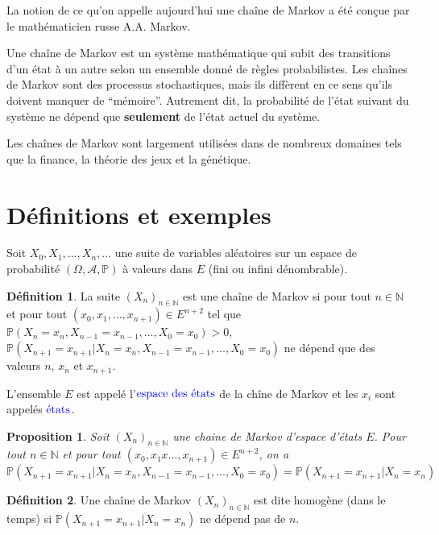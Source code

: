 \documentclass[
]{book}
\newtheorem{proposition}{Proposition}[chapter]
\theoremstyle{definition}
\newtheorem{definition}{Définition}[chapter]
\theoremstyle{definition}
\theoremstyle{definition}
\theoremstyle{remark}
\begin{document}
La notion de ce qu'on appelle aujourd'hui une chaîne de Markov a été conçue par le mathématicien russe A.A. Markov.

Une chaîne de Markov est un système mathématique qui subit des transitions d'un état à un autre selon un ensemble donné de règles probabilistes. Les chaînes de Markov sont des processus stochastiques, mais ils diffèrent en ce sens qu'ils doivent manquer de ``mémoire''. Autrement dit, la probabilité de l'état suivant du système ne dépend que \textbf{seulement} de l'état actuel du système.

Les chaînes de Markov sont largement utilisées dans de nombreux domaines tels que la finance, la théorie des jeux et la génétique.

\hypertarget{duxe9finitions-et-exemples}{%
\section{Définitions et exemples}\label{duxe9finitions-et-exemples}}

Soit \(X_0, X_1,\ldots, X_n, \ldots\) une suite de variables aléatoires sur un espace de probabilité \((\Omega,\mathcal{A}, \mathbb{P})\) à valeurs dans \(E\) (fini ou infini dénombrable).

\begin{definition}
\protect\hypertarget{def:unnamed-chunk-21}{}{\label{def:unnamed-chunk-21} }La suite \((X_n)_{n \in \mathbb{N}}\) est une chaîne de Markov si pour tout \(n \in \mathbb{N}\) et pour tout \((x_0,x_1, \ldots,x_{n+1}) \in E^{n+2}\) tel que \(\mathbb{P}(X_n=x_n, X_{n-1}=x_{n-1},\ldots, X_0=x_0) >0\), \(\mathbb{P}(X_{n+1}=x_{n+1}|X_n=x_n,X_{n-1}=x_{n-1},\ldots, X_0=x_0)\) ne dépend que des valeurs \(n\), \(x_n\) et \(x_{n+1}\).
\end{definition}
L'ensemble \(E\) est appelé l'\(\color{blue}{\mathbf{\text{espace des états}}}\) de la chîne de Markov et les \(x_i\) sont appelés \(\color{blue}{\mathbf{\text{états}}}\).
\begin{proposition}
\protect\hypertarget{prp:unnamed-chunk-22}{}{\label{prp:unnamed-chunk-22} }Soit \((X_n)_{n \in \mathbb{N}}\) une chaine de Markov d'espace d'états \(E\). Pour tout \(n \in \mathbb{N}\) et pour tout \((x_0,x_1x\ldots,x_{n+1})\in E^{n+2}\), on a
\[\mathbb{P}(X_{n+1}=x_{n+1}|X_n=x_n,X_{n-1}=x_{n-1},\ldots, X_0=x_0)=\mathbb{P}(X_{n+1}=x_{n+1}|X_n=x_n)\]
\end{proposition}

\begin{definition}
\protect\hypertarget{def:unnamed-chunk-23}{}{\label{def:unnamed-chunk-23} }Une chaîne de Markov \((X_n)_{n \in \mathbb{N}}\) est dite homogène (dans le temps) si \(\mathbb{P}(X_{n+1}=x_{n+1}|X_n=x_n)\) ne dépend pas de \(n\).
\end{definition}
\end{document}
